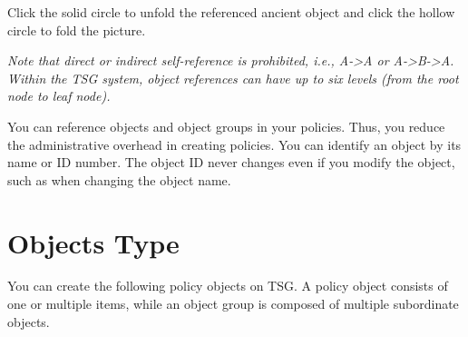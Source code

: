 Click the solid circle to unfold the referenced ancient object and click the hollow circle to fold the picture.


\notemark\textit{Note that direct or indirect self-reference is prohibited, i.e., A->A or A->B->A. Within the TSG system, object references can have up to six levels (from the root node to leaf node).}


You can reference objects and object groups in your policies. Thus, you reduce the administrative overhead in creating policies. You can identify an object by its name or ID number. 
The object ID never changes even if you modify the object, such as when changing the object name. 


\section*{\hypertarget{link:Objects Type}{Objects Type}}
\label{sec:objects:type}

You can create the following policy objects on TSG. A policy object consists of one or multiple items, while an object group is composed of multiple subordinate objects.


